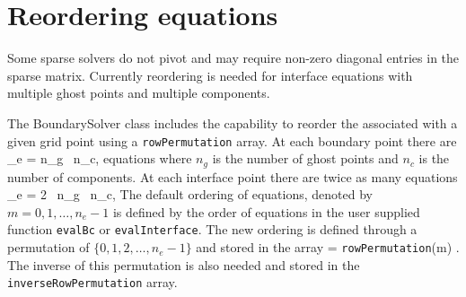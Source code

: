 \documentclass{article}
\def\ba#1\ea{\begin{align}#1\end{align}}
\def\bas#1\eas{\begin{align*}#1\end{align*}}
\begin{document}
\section{Reordering equations}

Some sparse solvers do not pivot and may require non-zero diagonal entries in the sparse matrix.
Currently reordering is needed for interface equations with multiple ghost points and multiple
components. 

The BoundarySolver class includes the capability to reorder the
associated with
a given grid point using a \texttt{rowPermutation} array.
At each boundary point there are
\bas
   n_e = n_g \, n_c, \quad {}
\eas
equations where $n_g$ is the number of ghost points and $n_c$ is the number of components. 
At each interface point there are twice as many equations
\bas
   n_e = 2 \, n_g \, n_c,  \quad {}
\eas
The default ordering of equations, denoted by $m=0,1,\ldots,n_e-1$
is defined by the order of equations in the
user supplied function \texttt{evalBc} or \texttt{evalInterface}. 
The new ordering is defined through a permutation of $\{ 0,1,2,\ldots,n_e-1\}$ and stored in the array
\ba
     \tilde{m} = \texttt{rowPermutation}(m) .
\ea
The inverse of this permutation is also needed and stored in the \texttt{inverseRowPermutation} array.
\end{document}
